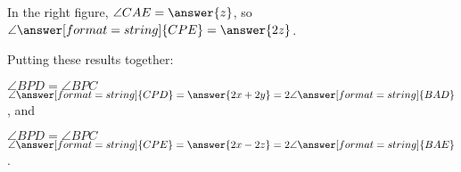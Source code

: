 \documentclass[handout,nooutcomes]{ximera}
\begin{document}
\begin{problem}
\begin{problem}
\begin{problem}
In the right figure, $\angle CAE = \answer{z}$, so $\angle \answer[format=string]{CPE} = \answer{2z}$.  

Putting these results together:

 $\angle BPD = \angle BPC$ \wordChoice{\choice[correct]{$+$}\choice{$-$}\choice{$\times$}\choice{$\div$}}$ \angle \answer[format=string]{CPD} 
 = \answer{2x + 2y} = 2 \angle \answer[format=string]{BAD}$, and 

 $\angle BPD = \angle BPC$ \wordChoice{\choice{$+$}\choice[correct]{$-$}\choice{$\times$}\choice{$\div$}} $\angle \answer[format=string]{CPE} 
 = \answer{2x - 2z} = 2 \angle \answer[format=string]{BAE}$.  

\end{problem}
\end{problem}
 

\end{problem}
\end{document}
